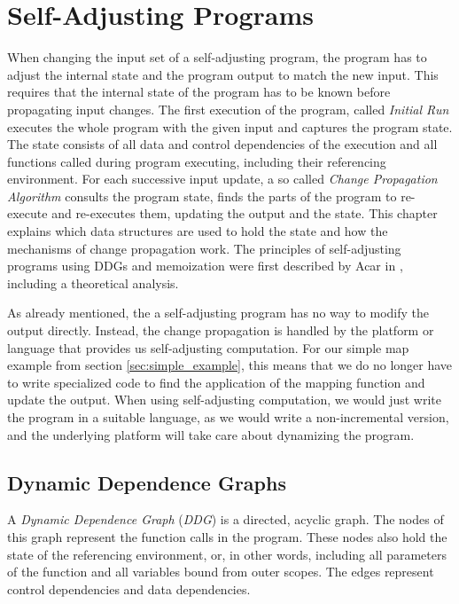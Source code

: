 
\chapter{Self-Adjusting Programs}
\label{ch:self_adjusting}

When changing the input set of a self-adjusting program, the program has to adjust the internal state and the program output to match the new input. This requires that the internal state of the program has to be known before propagating input changes. The first execution of the program, called \textit{Initial Run} executes the whole program with the given input and captures the program state. The state consists of all data and control dependencies of the execution and all functions called during program executing, including their referencing environment. 
For each successive input update, a so called \textit{Change Propagation Algorithm} consults the program state, finds the parts of the program to re-execute and re-executes them, updating the output and the state.  
This chapter explains which data structures are used to hold the state and how the mechanisms of change propagation work. The principles of self-adjusting programs using DDGs and memoization were first described by Acar in \cite{Acar2005thesis}, including a theoretical analysis. 

As already mentioned, the a self-adjusting program has no way to modify the output directly. Instead, the change propagation is handled by the platform or language that provides us self-adjusting computation. For our simple map example from section \ref{sec:simple_example}, this means that we do no longer have to write specialized code to find the application of the mapping function and update the output. When using self-adjusting computation, we would just write the program in a suitable language, as we would write a non-incremental version, and the underlying platform will take care about dynamizing the program.

\section{Dynamic Dependence Graphs}
\label{sec:ddg}

A \textit{Dynamic Dependence Graph} (\textit{DDG}) is a directed, acyclic graph. The nodes of this graph represent the function calls in the program. These nodes also hold the state of the referencing environment, or, in other words, including all parameters of the function and all variables bound from outer scopes. The edges represent control dependencies and data dependencies. 

